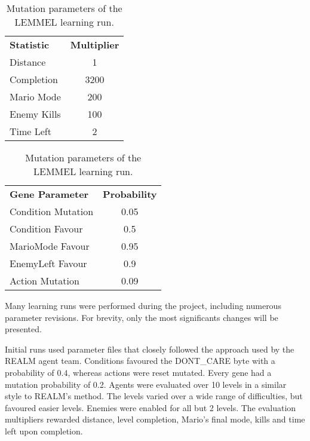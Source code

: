 \begin{table}
  \parbox{.45\linewidth}{
  \begin{center} \small
    \begin{tabular}{ | l | c | }
    \hline
    \textbf{Statistic} & \textbf{Multiplier} \TBstrut \\ \thickhline
    Distance & 1 \\ \hline
    Completion & 3200 \\ \hline
    Mario Mode & 200 \\ \hline
    Enemy Kills & 100 \\ \hline
    Time Left & 2 \\ \hline
    \end{tabular}
   \end{center}

  \caption{Evaluation multipliers of the LEMMEL learning run.}
  \label{tab:multparams}
  }
  \hfill
  \parbox{.5\linewidth}{
  \begin{center} \small
    \begin{tabular}{ | l | c | }
    \hline
    \textbf{Gene Parameter} & \textbf{Probability} \TBstrut \\ \thickhline
    Condition Mutation & 0.05 \\ \hline
    Condition Favour & 0.5 \\ \hline
    MarioMode Favour & 0.95 \\ \hline
    EnemyLeft Favour & 0.9 \\ \hline
    Action Mutation & 0.09 \\ \hline
    \end{tabular}
  \end{center}
  \caption{Mutation parameters of the LEMMEL learning run.}
  \label{tab:mutaparams}
}
\end{table}

Many learning runs were performed during the project, including numerous parameter revisions. For brevity, only the most significants changes will be presented.

Initial runs used parameter files that closely followed the approach used by the REALM agent team. Conditions favoured the {\footnotesize DONT\_CARE} byte with a probability of $0.4$, whereas actions were reset mutated. Every gene had a mutation probability of 0.2. Agents were evaluated over 10 levels in a similar style to REALM's method. The levels varied over a wide range of difficulties, but favoured easier levels. Enemies were enabled for all but 2 levels. The evaluation multipliers rewarded distance, level completion, Mario's final mode, kills and time left upon completion.

